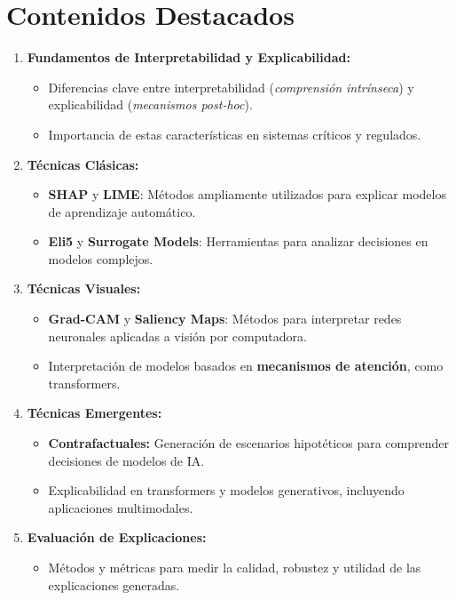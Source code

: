 \section*{Contenidos Destacados}
\begin{enumerate}
    \item \textbf{Fundamentos de Interpretabilidad y Explicabilidad:}
    \begin{itemize}
        \item Diferencias clave entre interpretabilidad (\textit{comprensión intrínseca}) y explicabilidad (\textit{mecanismos post-hoc}).
        \item Importancia de estas características en sistemas críticos y regulados.
    \end{itemize}
\newpage
    \item \textbf{Técnicas Clásicas:}
    \begin{itemize}
        \item \textbf{SHAP} y \textbf{LIME}: Métodos ampliamente utilizados para explicar modelos de aprendizaje automático.
        \item \textbf{Eli5} y \textbf{Surrogate Models}: Herramientas para analizar decisiones en modelos complejos.
    \end{itemize}

    \item \textbf{Técnicas Visuales:}
    \begin{itemize}
        \item \textbf{Grad-CAM} y \textbf{Saliency Maps}: Métodos para interpretar redes neuronales aplicadas a visión por computadora.
        \item Interpretación de modelos basados en \textbf{mecanismos de atención}, como transformers.
    \end{itemize}

    \item \textbf{Técnicas Emergentes:}
    \begin{itemize}
        \item \textbf{Contrafactuales:} Generación de escenarios hipotéticos para comprender decisiones de modelos de IA.
        \item Explicabilidad en transformers y modelos generativos, incluyendo aplicaciones multimodales.
    \end{itemize}

    \item \textbf{Evaluación de Explicaciones:}
    \begin{itemize}
        \item Métodos y métricas para medir la calidad, robustez y utilidad de las explicaciones generadas.
    \end{itemize}
\end{enumerate}

